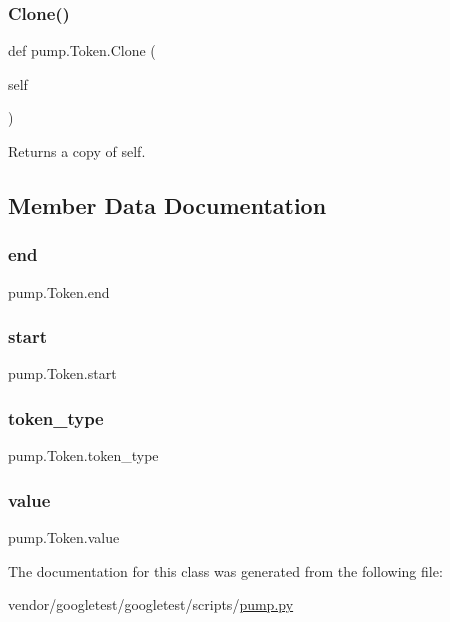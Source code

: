 \subsubsection{\texorpdfstring{Clone()}{Clone()}}
{\footnotesize\ttfamily def pump.\+Token.\+Clone (\begin{DoxyParamCaption}\item[{}]{self }\end{DoxyParamCaption})}

\begin{DoxyVerb}Returns a copy of self.\end{DoxyVerb}
 

\subsection{Member Data Documentation}
\mbox{\label{classpump_1_1_token_abb88c0ece4274cfd974fd01d0468953c}} 
\subsubsection{\texorpdfstring{end}{end}}
{\footnotesize\ttfamily pump.\+Token.\+end}

\mbox{\label{classpump_1_1_token_a53e3333a770bc8773224a5af78bca5bb}} 
\subsubsection{\texorpdfstring{start}{start}}
{\footnotesize\ttfamily pump.\+Token.\+start}

\mbox{\label{classpump_1_1_token_aeac105b76f6af13c8c64ba0a94e37d90}} 
\subsubsection{\texorpdfstring{token\+\_\+type}{token\_type}}
{\footnotesize\ttfamily pump.\+Token.\+token\+\_\+type}

\mbox{\label{classpump_1_1_token_a5b7ab395a380b775b2bf0a8b0abfda86}} 
\subsubsection{\texorpdfstring{value}{value}}
{\footnotesize\ttfamily pump.\+Token.\+value}



The documentation for this class was generated from the following file\+:\begin{DoxyCompactItemize}
\item 
vendor/googletest/googletest/scripts/\hyperlink{pump_8py}{pump.\+py}\end{DoxyCompactItemize}
